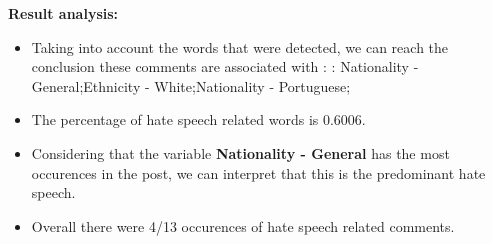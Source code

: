 \documentclass[11pt]{article}
\begin{document}
\textbf{\Large Result analysis:}

\begin{itemize}\item Taking into account the words that were detected, we can reach the conclusion these comments are associated with : : Nationality - General;Ethnicity - White;Nationality - Portuguese;%

\item The percentage of hate speech related words is 0.6006.

\item Considering that the variable \textbf{Nationality - General} has the most occurences in the post, we can interpret that this is the predominant hate speech.

\item Overall there were 4/13 occurences of hate speech related comments.\end{itemize}
\end{document}
